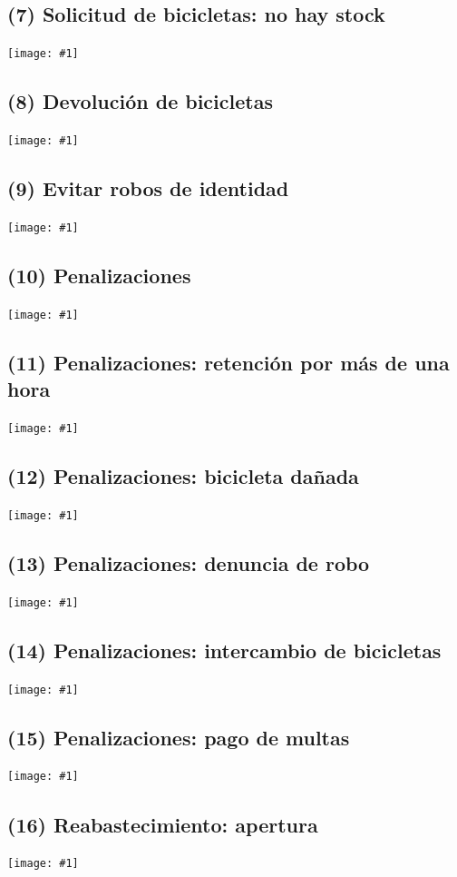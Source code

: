 \documentclass[a4paper, 10pt, twoside]{article}
\newcommand{\diagrama}[1]{
  \texttt{[image: \#1]}
}
\begin{document}
\subsection{(7)    Solicitud de bicicletas: no hay stock}
\diagrama{objetivos-7}

\subsection{(8)    Devolución de bicicletas}
\diagrama{objetivos-8}

\subsection{(9)    Evitar robos de identidad}
\diagrama{objetivos-9}

\subsection{(10)   Penalizaciones}
\diagrama{objetivos-10}

\subsection{(11)   Penalizaciones: retención por más de una hora}
\diagrama{objetivos-11}

\subsection{(12)   Penalizaciones: bicicleta dañada}
\diagrama{objetivos-12}

\subsection{(13)   Penalizaciones: denuncia de robo}
\diagrama{objetivos-13}

\subsection{(14)   Penalizaciones: intercambio de bicicletas}
\diagrama{objetivos-14}

\subsection{(15)   Penalizaciones: pago de multas}
\diagrama{objetivos-15}

\subsection{(16)   Reabastecimiento: apertura}
\diagrama{objetivos-16}
\end{document}
